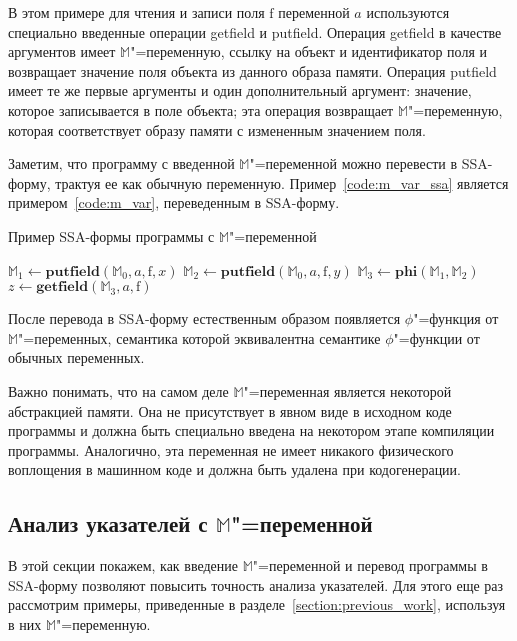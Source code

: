 \documentclass[14pt,titlepage,draft]{extarticle}
\newcommand{\M}{\ensuremath{\mathbb{M}}}
\let\mathphi\phi
\renewcommand{\phi}{\ensuremath{\mathphi}}
\newcommand{\field}[1]{\mathrm{#1}}
\newcommand{\op}[1]{\mathbf{#1}}
\begin{document}
    В этом примере для чтения и записи поля $\field{f}$ переменной $a$
    используются специально введенные операции getfield и putfield. Операция
    getfield в качестве аргументов имеет \M"=переменную, ссылку на объект и
    идентификатор поля и возвращает значение поля объекта из данного
    образа памяти. Операция putfield имеет те же первые аргументы и один
    дополнительный аргумент: значение, которое записывается в поле объекта;
    эта операция возвращает \M"=переменную, которая соответствует образу
    памяти с измененным значением поля.

    Заметим, что программу с введенной \M"=переменной можно перевести в
    SSA-форму, трактуя ее как обычную переменную. Пример~\ref{code:m_var_ssa}
    является примером~\ref{code:m_var}, переведенным в SSA-форму.

    \begin{algorithm}
      \caption{Пример SSA-формы программы с \M"=переменной}
      \label{code:m_var_ssa}
      \begin{algorithmic}[1]
        \If{\ldots}
          \State $\M_1 \gets \op{putfield}(\M_0, a, \field{f}, x)$
        \Else
          \State $\M_2 \gets \op{putfield}(\M_0, a, \field{f}, y)$
        \EndIf
        \State $\M_3 \gets \op{phi}(\M_1, \M_2)$
        \State $z \gets \op{getfield}(\M_3, a, \field{f})$
      \end{algorithmic}
    \end{algorithm}

    После перевода в SSA-форму естественным образом появляется \phi"=функция
    от \M"=переменных, семантика которой эквивалентна семантике \phi"=функции
    от обычных переменных.

    Важно понимать, что на самом деле \M"=переменная является некоторой
    абстракцией памяти. Она не присутствует в явном виде в исходном коде
    программы и должна быть специально введена на некотором этапе компиляции
    программы. Аналогично, эта переменная не имеет никакого физического
    воплощения в машинном коде и должна быть удалена при кодогенерации.

  \subsection{Анализ указателей с \texorpdfstring{\M}{M}"=переменной}

    В этой секции покажем, как введение \M"=переменной и перевод программы в
    SSA-форму позволяют повысить точность анализа указателей. Для этого еще
    раз рассмотрим примеры, приведенные в
    разделе~\ref{section:previous_work}, используя в них \M"=переменную.
\end{document}
